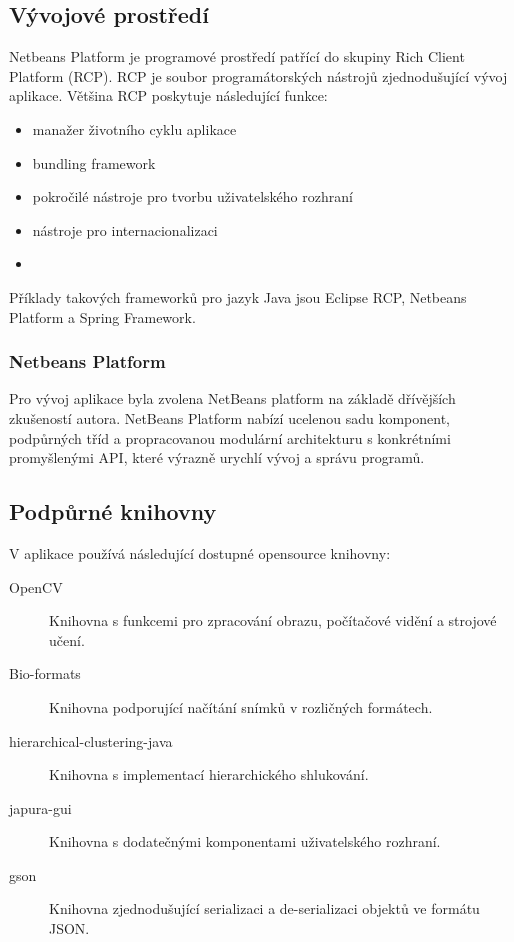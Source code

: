 \documentclass[11pt,twoside,a4paper,table]{book}
\begin{document}
\subsection{Vývojové prostředí}
Netbeans Platform je programové prostředí patřící do skupiny Rich Client Platform (RCP). RCP je soubor programátorských nástrojů zjednodušující vývoj aplikace. Většina RCP poskytuje následující funkce:
\begin{itemize}
	\item manažer životního cyklu aplikace
	\item bundling framework
	\item pokročilé nástroje pro tvorbu uživatelského rozhraní
	\item nástroje pro internacionalizaci
	\item 
\end{itemize}

Příklady takových frameworků pro jazyk Java jsou Eclipse RCP, Netbeans Platform a Spring Framework.

\subsubsection{Netbeans Platform}
Pro vývoj aplikace byla zvolena NetBeans platform na základě dřívějších zkušeností autora. NetBeans Platform nabízí ucelenou sadu komponent, podpůrných tříd a propracovanou modulární architekturu s konkrétními promyšlenými API, které výrazně urychlí vývoj a správu programů.

\subsection{Podpůrné knihovny}
V aplikace používá následující dostupné opensource knihovny:
\begin{description}
	\item[OpenCV] Knihovna s funkcemi pro zpracování obrazu, počítačové vidění a strojové učení.
	\item[Bio-formats] Knihovna podporující načítání snímků v rozličných formátech.
	\item[hierarchical-clustering-java] Knihovna s implementací hierarchického shlukování.
	\item[japura-gui] Knihovna s dodatečnými komponentami uživatelského rozhraní.
	\item[gson] Knihovna zjednodušující serializaci a de-serializaci objektů ve formátu JSON.
\end{description}
\end{document}
